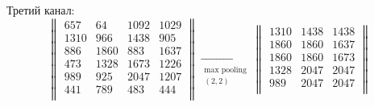 \documentclass[12pt, a4paper]{extarticle}
\begin{document}
\begin{enumerate}
        Третий канал:
        \begin{equation}
            \begin{Vmatrix}
                657 & 64 & 1092 & 1029 \\
                1310 & 966 & 1438 & 905 \\
                886 & 1860 & 883 & 1637 \\
                473 & 1328 & 1673 & 1226 \\
                989 & 925 & 2047 & 1207 \\
                441 & 789 & 483 & 444 \\
            \end{Vmatrix}
            \xrightarrow[\begin{array}{c} \text{max pooling} \\ (2, 2) \end{array}]{}
            \begin{Vmatrix}
                1310 & 1438 & 1438 \\
                1860 & 1860 & 1637 \\
                1860 & 1860 & 1673 \\
                1328 & 2047 & 2047 \\
                989 & 2047 & 2047 \\
            \end{Vmatrix}
        \end{equation}
        

\end{enumerate}
\end{document}
